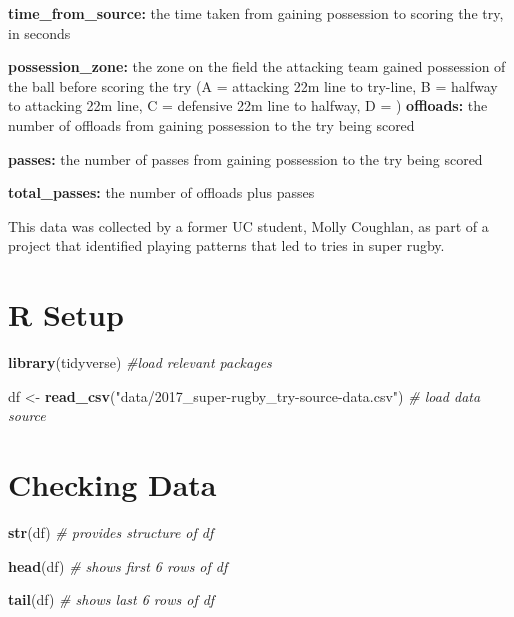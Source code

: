 \documentclass[
]{article}
\newenvironment{Shaded}{\begin{snugshade}}{\end{snugshade}}
\newcommand{\CommentTok}[1]{\textcolor[rgb]{0.56,0.35,0.01}{\textit{#1}}}
\newcommand{\KeywordTok}[1]{\textcolor[rgb]{0.13,0.29,0.53}{\textbf{#1}}}
\newcommand{\NormalTok}[1]{#1}
\newcommand{\StringTok}[1]{\textcolor[rgb]{0.31,0.60,0.02}{#1}}
\begin{document}
\textbf{time\_from\_source:} the time taken from gaining possession to
scoring the try, in seconds

\textbf{possession\_zone:} the zone on the field the attacking team
gained possession of the ball before scoring the try (A = attacking 22m
line to try-line, B = halfway to attacking 22m line, C = defensive 22m
line to halfway, D = ) \textbf{offloads:} the number of offloads from
gaining possession to the try being scored

\textbf{passes:} the number of passes from gaining possession to the try
being scored

\textbf{total\_passes:} the number of offloads plus passes

This data was collected by a former UC student, Molly Coughlan, as part
of a project that identified playing patterns that led to tries in super
rugby.

\hypertarget{r-setup}{%
\section{\texorpdfstring{\textbf{R Setup}}{R Setup}}\label{r-setup}}

\begin{Shaded}
\begin{Highlighting}[]
\KeywordTok{library}\NormalTok{(tidyverse) }\CommentTok{#load relevant packages}

\NormalTok{df <-}\StringTok{ }\KeywordTok{read_csv}\NormalTok{(}\StringTok{"data/2017_super-rugby_try-source-data.csv"}\NormalTok{) }\CommentTok{# load data source}
\end{Highlighting}
\end{Shaded}

\hypertarget{checking-data}{%
\section{\texorpdfstring{\textbf{Checking
Data}}{Checking Data}}\label{checking-data}}

\begin{Shaded}
\begin{Highlighting}[]
\KeywordTok{str}\NormalTok{(df) }\CommentTok{# provides structure of df}


\KeywordTok{head}\NormalTok{(df) }\CommentTok{# shows first 6 rows of df}


\KeywordTok{tail}\NormalTok{(df) }\CommentTok{# shows last 6 rows of df}
\end{Highlighting}
\end{Shaded}
\end{document}
